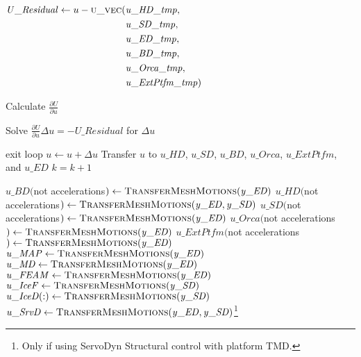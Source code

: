 \documentclass[10pt,letterpaper,oneside,notitlepage]{article}
\begin{document}
\begin{algorithmic}[1]
      \State
      \State$\mathit{U\_Residual} \gets u - \Call{u\_vec}{}( \!
                 \begin{aligned}[t]   & \mathit{u\_HD\_tmp}, \\
                                      & \mathit{u\_SD\_tmp}, \\
                                      & \mathit{u\_ED\_tmp}, \\
                                      & \mathit{u\_BD\_tmp}, \\
                                      & \mathit{u\_Orca\_tmp},\\
                                      & \mathit{u\_ExtPtfm\_tmp})
                     \end{aligned}$
      \State
      
         \State Calculate $\frac{\partial U}{\partial u}$
      \EndIf
      

      \State Solve  $\frac{\partial U}{\partial u} \Delta u = - \mathit{U\_Residual}$ for $\Delta u$

      \State    
       
         \State exit loop
      \EndIf
      \State
      \State $u \gets u + \Delta u$
      \State Transfer $u$ to $\mathit{u\_HD}$, $\mathit{u\_SD}$, $\mathit{u\_BD}$, $\mathit{u\_Orca}$, $\mathit{u\_ExtPtfm}$, and $\mathit{u\_ED}$
      \State $k=k+1$
      
   \EndLoop   
   
   \State{}
   \State 
   
   \State$\mathit{u\_BD}($not accelerations$) \gets \Call{TransferMeshMotions}{\mathit{y\_ED}}$
   \State$\mathit{u\_HD}($not accelerations$) \gets \Call{TransferMeshMotions}{\mathit{y\_ED},\mathit{y\_SD}}$
   \State$\mathit{u\_SD}($not accelerations$) \gets \Call{TransferMeshMotions}{\mathit{y\_ED}}$
   \State$\mathit{u\_Orca}($not accelerations$) \gets \Call{TransferMeshMotions}{\mathit{y\_ED}}$   \State$\mathit{u\_ExtPtfm}($not accelerations$) \gets \Call{TransferMeshMotions}{\mathit{y\_ED}}$
  \State 
   \State $\mathit{u\_MAP}     \gets \Call{TransferMeshMotions}{\mathit{y\_ED}}$
   \State $\mathit{u\_MD}      \gets \Call{TransferMeshMotions}{\mathit{y\_ED}}$
   \State $\mathit{u\_FEAM}    \gets \Call{TransferMeshMotions}{\mathit{y\_ED}}$
   \State $\mathit{u\_IceF}    \gets \Call{TransferMeshMotions}{\mathit{y\_SD}}$
   \State $\mathit{u\_IceD(:)} \gets \Call{TransferMeshMotions}{\mathit{y\_SD}}$
   \State $\mathit{u\_SrvD}    \gets \Call{TransferMeshMotions}{\mathit{y\_ED,y\_SD}}$\footnote{Only if using ServoDyn Structural control with platform TMD.}    %
         

\end{algorithmic}
\end{document}
